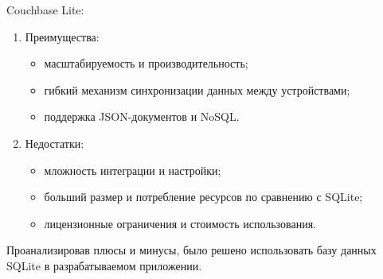 Couchbase Lite:
\begin{enumerate}
    \item Преимущества:
    \begin{itemize}
        \item масштабируемость и производительность;
        \item гибкий механизм синхронизации данных между устройствами;
        \item поддержка JSON-документов и NoSQL.
    \end{itemize}
    \item Недостатки:
    \begin{itemize}
        \item мложность интеграции и настройки;
        \item больший размер и потребление ресурсов по сравнению с SQLite;
        \item лицензионные ограничения и стоимость использования.
    \end{itemize}
\end{enumerate}

Проанализировав плюсы и минусы, было решено использовать базу данных SQLite в разрабатываемом приложении.
